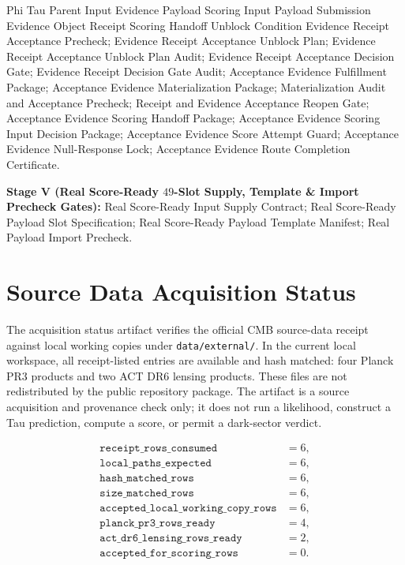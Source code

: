 \documentclass[11pt]{article}
\begin{document}
Phi Tau Parent Input Evidence Payload Scoring Input Payload Submission Evidence Object Receipt Scoring Handoff Unblock Condition Evidence Receipt Acceptance Precheck;
Evidence Receipt Acceptance Unblock Plan;
Evidence Receipt Acceptance Unblock Plan Audit;
Evidence Receipt Acceptance Decision Gate;
Evidence Receipt Decision Gate Audit;
Acceptance Evidence Fulfillment Package;
Acceptance Evidence Materialization Package;
Materialization Audit and Acceptance Precheck;
Receipt and Evidence Acceptance Reopen Gate;
Acceptance Evidence Scoring Handoff Package;
Acceptance Evidence Scoring Input Decision Package;
Acceptance Evidence Score Attempt Guard;
Acceptance Evidence Null-Response Lock;
Acceptance Evidence Route Completion Certificate.

\smallskip\noindent\textbf{Stage V (Real Score-Ready $49$-Slot Supply, Template \& Import Precheck Gates):}
Real Score-Ready Input Supply Contract;
Real Score-Ready Payload Slot Specification;
Real Score-Ready Payload Template Manifest;
Real Payload Import Precheck.
\par\endgroup

\section{Source Data Acquisition Status}

The acquisition status artifact verifies the official CMB source-data receipt
against local working copies under \texttt{data/external/}. In the current
local workspace, all receipt-listed entries are available and hash matched:
four Planck PR3 products and two ACT DR6 lensing products. These files are not
redistributed by the public repository package. The artifact is a source
acquisition and provenance check only; it does not run a likelihood, construct
a Tau prediction, compute a score, or permit a dark-sector verdict.

\[
\begin{array}{ll}
\texttt{receipt\_rows\_consumed} &= 6,\\
\texttt{local\_paths\_expected} &= 6,\\
\texttt{hash\_matched\_rows} &= 6,\\
\texttt{size\_matched\_rows} &= 6,\\
\texttt{accepted\_local\_working\_copy\_rows} &= 6,\\
\texttt{planck\_pr3\_rows\_ready} &= 4,\\
\texttt{act\_dr6\_lensing\_rows\_ready} &= 2,\\
\texttt{accepted\_for\_scoring\_rows} &= 0.
\end{array}
\]
\end{document}

